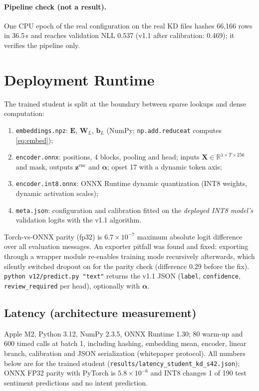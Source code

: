 \documentclass[11pt,a4paper]{article}
\theoremstyle{remark}
\newcommand{\lbl}[1]{\texttt{#1}}
\newcommand{\R}{\mathbb{R}}
\newcommand{\W}{\bm{W}}
\newcommand{\bb}{\bm{b}}
\newcommand{\z}{\bm{z}}
\begin{document}
\paragraph{Pipeline check (not a result).} One CPU epoch of the real configuration on the real KD files hashes 66{,}166 rows in 36.5\,s and reaches validation NLL 0.537 (v1.1 after calibration: 0.469); it verifies the pipeline only.

\section{Deployment Runtime}
\label{sec:deploy}

The trained student is split at the boundary between sparse lookups and dense computation:
\begin{enumerate}
  \item \texttt{embeddings.npz}: $\bm E$, $\W_L$, $\bb_L$ (NumPy; \texttt{np.add.reduceat} computes \cref{eq:embed});
  \item \texttt{encoder.onnx}: positions, 4 blocks, pooling and head; inputs $\bm X\in\R^{1\times T\times256}$ and mask, outputs $\z^{\text{enc}}$ and $\bm\alpha$; opset 17 with a dynamic token axis;
  \item \texttt{encoder.int8.onnx}: ONNX Runtime dynamic quantization (INT8 weights, dynamic activation scales);
  \item \texttt{meta.json}: configuration and calibration fitted on the \emph{deployed INT8 model's} validation logits with the v1.1 algorithm.
\end{enumerate}
Torch-vs-ONNX parity (fp32) is $6.7\times10^{-7}$ maximum absolute logit difference over all evaluation messages. An exporter pitfall was found and fixed: exporting through a wrapper module re-enables training mode recursively afterwards, which silently switched dropout on for the parity check (difference 0.29 before the fix). \texttt{python v12/predict.py "text"} returns the v1.1 JSON (\lbl{label}, \lbl{confidence}, \lbl{review\_required} per head), optionally with $\bm\alpha$.

\subsection{Latency (architecture measurement)}
Apple M2, Python 3.12, NumPy 2.3.5, ONNX Runtime 1.30; 80 warm-up and 600 timed calls at batch 1, including hashing, embedding mean, encoder, linear branch, calibration and JSON serialization (whitepaper protocol). All numbers below are for the trained student (\texttt{results/latency\_student\_kd\_s42.json}); ONNX FP32 parity with PyTorch is $5.8\times10^{-6}$ and INT8 changes 1 of 190 test sentiment predictions and no intent prediction.
\end{document}
